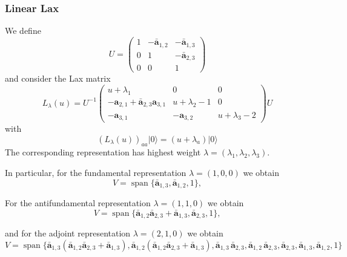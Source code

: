 \documentclass[12pt,reqno]{amsart}
\newcommand{\oa}{\mathbf{a}}
\newcommand{\oad}{\bar{\mathbf{a}}}
\numberwithin{equation}{section}
\begin{document}
\subsubsection{Linear Lax}
We define
\begin{equation}
 U=\left(\begin{array}{ccc}
             1&-\oad_{1,2}&-\oad_{1,3}\\
             0&1&-\oad_{2,3}\\
             0&0&1
            \end{array}
\right)
\end{equation}
and consider the Lax matrix
\begin{equation}
 L_\lambda(u)=U^{-1}\left(\begin{array}{ccc}
             u+\lambda_1&0&0\\
             -\oa_{2,1}+\oad_{2,3}\oa_{3,1}&u+\lambda_2-1&0\\
             -\oa_{3,1}&-\oa_{3,2}&u+\lambda_3-2
            \end{array}
\right)U
\end{equation}
with
\begin{equation}
 (L_\lambda(u))_{aa}|0\rangle =(u+\lambda_a)|0\rangle
\end{equation}
The corresponding representation has highest weight $\lambda=(\lambda_1,\lambda_2,\lambda_3)$.


In particular, for the fundamental representation $\lambda=(1,0,0)$ we obtain
\begin{equation}
V=\operatorname{span}\{\oad_{1,3},\oad_{1,2},1\},
\end{equation}

 
For the antifundamental representation $\lambda=(1,1,0)$ we obtain
\begin{equation}
V=\operatorname{span}\{\oad_{1,2}\oad_{2,3}+\oad_{1,3},\oad_{2,3},1\},
\end{equation}
 
and for the adjoint representation $\lambda=(2,1,0)$ we obtain
\begin{equation}
V=\operatorname{span}\{\oad_{1,3}(\oad_{1,2}\oad_{2,3}+\oad_{1,3}),\oad_{1,2} (\oad_{1,2}\oad_{2,3}+\oad_{1,3}),\oad_{1,3}\,\oad_{2,3},\oad_{1,2}\,\oad_{2,3},\oad_{2,3},\oad_{1,3},\oad_{1,2},1\}
\label{eqn:adjoint_oscillator_basis}
\end{equation}
 
\end{document}
